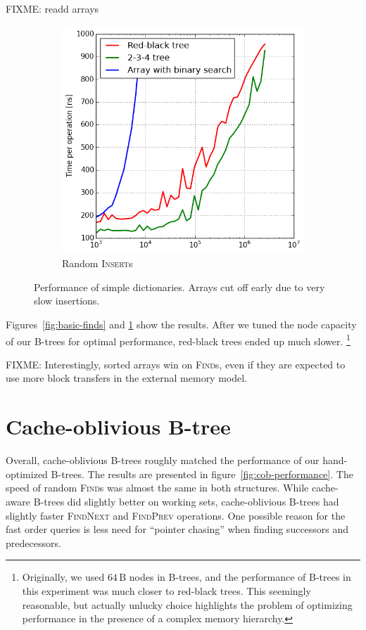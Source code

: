 FIXME: readd arrays
\begin{figure}
\centering
\begin{subfigure}[t]{0.45\textwidth}
	\includegraphics[width=\textwidth]{img/performance/basic-random-insert}
	\caption{Random \textsc{Insert}s}
\end{subfigure}
\caption{Performance of simple dictionaries. Arrays cut off early due to very
	slow insertions.}
\label{fig:basic-perf}
\end{figure}

Figures~\ref{fig:basic-finds} and \ref{fig:basic-perf} show the results.
After we tuned the node capacity of our B-trees for optimal performance,
red-black trees ended up much slower.
\footnote{%
	Originally, we used $64\,\text{B}$ nodes in B-trees, and
	the performance of B-trees in this experiment was much closer
	to red-black trees. This seemingly reasonable, but actually unlucky
	choice highlights the problem of optimizing performance in the presence
	of a complex memory hierarchy.
}

FIXME: Interestingly, sorted arrays win on \textsc{Find}s, even if they are expected
to use more block transfers in the external memory model.

\section{Cache-oblivious B-tree}
\label{sec:cob-perf}
Overall, cache-oblivious B-trees roughly matched the performance of our
hand-optimized B-trees. The results are presented in
figure~\ref{fig:cob-performance}. The speed of random \textsc{Find}s was
almost the same in both structures. While cache-aware B-trees did slightly
better on working sets, cache-oblivious B-trees had slightly faster
\textsc{FindNext} and \textsc{FindPrev} operations.
One possible reason for the fast order queries is less need for
``pointer chasing'' when finding successors and predecessors.

